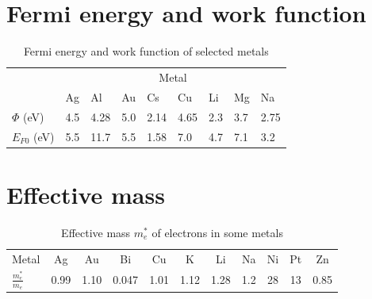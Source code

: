\section{Fermi energy and work function}
\begin{table}[ht!]
    \centering
    \begin{tabular}{lllllllll}
    \toprule
        & \multicolumn{8}{c}{Metal}\\ \cmidrule{2-9}
        & Ag & Al & Au & Cs & Cu & Li & Mg & Na \\ \midrule
        $\varPhi$ (\si{\electronvolt}) & 4.5 & 4.28 & 5.0 & 2.14 & 4.65 & 2.3 & 3.7 & 2.75 \\
        $E_{F0}$ (\si{\electronvolt}) & 5.5 & 11.7 & 5.5 & 1.58 & 7.0 & 4.7 & 7.1 & 3.2 \\
    \bottomrule
    \end{tabular}
    \caption{Fermi energy and work function of selected metals}
    \label{app:fermienergy}
\end{table}

\section{Effective mass}
\begin{table}[htbp]
    \centering
    \begin{tabular}{lcccccccccc}
    \toprule
    Metal & Ag & Au & Bi & Cu & K & Li & Na & Ni & Pt & Zn \\
    $\frac{m_e^*}{m_e}$ & 0.99 & 1.10 & 0.047 & 1.01 & 1.12 & 1.28 & 1.2 & 28 & 13 & 0.85 \\
    \bottomrule
    \end{tabular}
    \caption{Effective mass $m_e^*$ of electrons in some metals}
    \label{app:effectivemass}
\end{table}


